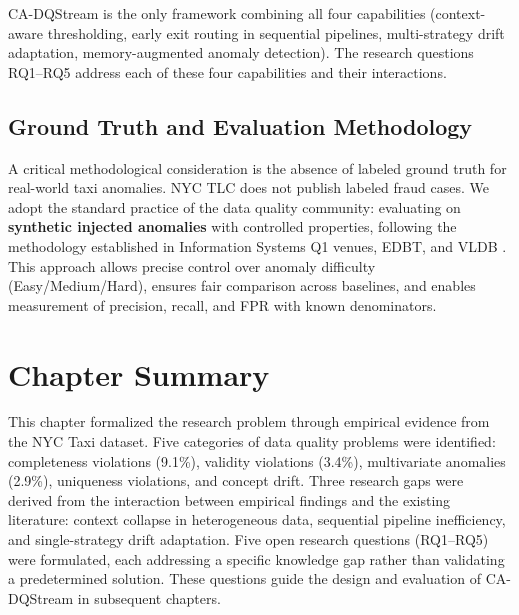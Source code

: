 CA-DQStream is the only framework combining all four capabilities (context-aware thresholding, early exit routing in sequential pipelines, multi-strategy drift adaptation, memory-augmented anomaly detection). The research questions RQ1--RQ5 address each of these four capabilities and their interactions.

\subsection{Ground Truth and Evaluation Methodology}

A critical methodological consideration is the absence of labeled ground truth for real-world taxi anomalies. NYC TLC does not publish labeled fraud cases. We adopt the standard practice of the data quality community: evaluating on \textbf{synthetic injected anomalies} with controlled properties, following the methodology established in Information Systems Q1 venues, EDBT, and VLDB \citep{DCRepair2022,DCRepair2024,bayesianQC2013,icewafl2025,adacontext2025,dafdiscover2024}. This approach allows precise control over anomaly difficulty (Easy/Medium/Hard), ensures fair comparison across baselines, and enables measurement of precision, recall, and FPR with known denominators.

\section{Chapter Summary}

This chapter formalized the research problem through empirical evidence from the NYC Taxi dataset. Five categories of data quality problems were identified: completeness violations (9.1\%), validity violations (3.4\%), multivariate anomalies (2.9\%), uniqueness violations, and concept drift. Three research gaps were derived from the interaction between empirical findings and the existing literature: context collapse in heterogeneous data, sequential pipeline inefficiency, and single-strategy drift adaptation. Five open research questions (RQ1--RQ5) were formulated, each addressing a specific knowledge gap rather than validating a predetermined solution. These questions guide the design and evaluation of CA-DQStream in subsequent chapters.
